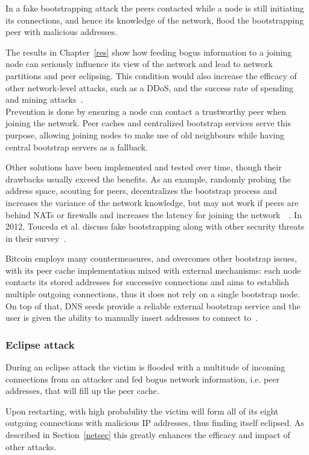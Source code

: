 \documentclass[12pt, letterpaper, twoside]{article}
\begin{document}
In a fake bootstrapping attack the peers contacted while a node is still initiating its connections, and hence its knowledge of the network, flood the bootstrapping peer with malicious addresses.

The results in Chapter~\ref{res} show how feeding bogus information to a joining node can seriously influence its view of the network and lead to network partitions and peer eclipsing. This condition would also increase the efficacy of other network-level attacks, such as a DDoS, and the success rate of spending and mining attacks~\cite{eclipseatk}.\\

Prevention is done by ensuring a node can contact a trustworthy peer when joining the network. Peer caches and centralized bootstrap services serve this purpose, allowing joining nodes to make use of old neighbours while having central bootstrap servers as a fallback.

Other solutions have been implemented and tested over time, though their drawbacks usually exceed the benefits. As an example, randomly probing the address space, scouting for peers, decentralizes the bootstrap process and increases the variance of the network knowledge, but may not work if peers are behind NATs or firewalls and increases the latency for joining the network~\cite{decentrbootstrapp2p}~\cite{localityaware}. In 2012,  Touceda et al. discuss fake bootstrapping along with other security threats in their survey~\cite{toucedafakeboot}.

Bitcoin employs many countermeasures, and overcomes other bootstrap issues, with its peer cache implementation mixed with external mechanisms: each node contacts its stored addresses for successive connections and aims to establish multiple outgoing connections, thus it does not rely on a single bootstrap node. On top of that, DNS seeds provide a reliable external bootstrap service and the user is given the ability to manually insert addresses to connect to~\cite{mahmoud_netsec_boot}.

\subsubsection{Eclipse attack}\label{sec:eclipse}
During an eclipse attack the victim is flooded with a multitude of incoming connections from an attacker and fed bogus network information, i.e. peer addresses, that will fill up the peer cache. 

Upon restarting, with high probability the victim will form all of its eight outgoing connections with malicious IP addresses, thus finding itself eclipsed. As described in Section~\ref{netsec} this greatly enhances the efficacy and impact of other attacks.
\end{document}
